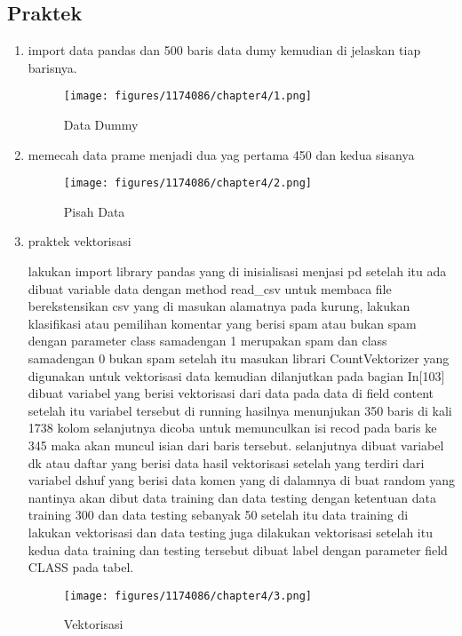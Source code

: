     \subsection{Praktek}
    \begin{enumerate}
        \item import data pandas dan 500 baris data dumy kemudian di jelaskan tiap barisnya. \hfill \break 
        
        \begin{figure}[H]
            \texttt{[image: figures/1174086/chapter4/1.png]}
            \centering
            \caption{Data Dummy}
        \end{figure}

        \item memecah data prame menjadi dua yag pertama 450 dan kedua sisanya \hfill \break 
        
        \begin{figure}[H]
            \texttt{[image: figures/1174086/chapter4/2.png]}
            \centering
            \caption{Pisah Data}
        \end{figure}

        \item praktek vektorisasi \hfill \break 
        
        lakukan import library pandas yang di inisialisasi menjasi pd setelah itu ada dibuat variable data dengan method read\_csv untuk membaca file berekstensikan csv yang di masukan alamatnya pada kurung, lakukan klasifikasi atau pemilihan komentar yang berisi spam atau bukan spam dengan parameter class samadengan 1 merupakan spam dan class samadengan 0 bukan spam setelah itu masukan librari CountVektorizer yang digunakan untuk vektorisasi data kemudian dilanjutkan pada bagian In[103] dibuat variabel yang berisi vektorisasi dari data pada data di field content setelah itu variabel tersebut di running hasilnya menunjukan 350 baris di kali 1738 kolom selanjutnya dicoba untuk memunculkan isi recod pada baris ke 345 maka akan muncul isian dari baris tersebut. selanjutnya dibuat variabel dk atau daftar yang berisi data hasil vektorisasi setelah yang terdiri dari variabel dshuf yang berisi data komen yang di dalamnya di buat random yang nantinya akan dibut data training dan data testing dengan ketentuan data training 300 dan data testing sebanyak 50 setelah itu data training di lakukan vektorisasi dan data testing juga dilakukan vektorisasi setelah itu kedua data training dan testing tersebut dibuat label dengan parameter field CLASS pada tabel.
        \begin{figure}[H]
            \texttt{[image: figures/1174086/chapter4/3.png]}
            \centering
            \caption{Vektorisasi}
        \end{figure}


\end{enumerate}
